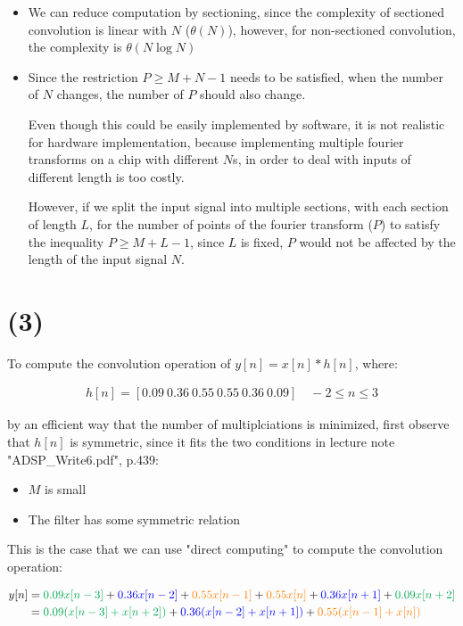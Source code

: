 \documentclass{article}
\begin{document}
\begin{itemize}
    \item We can reduce computation by sectioning, since the complexity of sectioned convolution is linear with $N$ ($\mathbb{\theta}(N)$),
    however, for non-sectioned convolution, the complexity is $\mathbb{\theta}(N \log N)$
    \item Since the restriction $P \geq M + N - 1$ needs to be satisfied, 
    when the number of $N$ changes, the number of $P$ should also change.
    \bigskip

    Even though this could be easily implemented by software, 
    it is not realistic for hardware implementation,
    because implementing multiple fourier transforms on a chip with different $N$s, 
    in order to deal with inputs of different length is too costly.
    \bigskip

    However, if we split the input signal into multiple sections,
    with each section of length $L$, 
    for the number of points of the fourier transform ($P$) to satisfy the inequality $P \geq M + L - 1$, 
    since $L$ is fixed, $P$ would not be affected by the length of the input signal $N$.
\end{itemize}

\section*{(3)}

To compute the convolution operation of $y[n] =  x[n] * h[n]$, where:

\begin{align*}
    h[n] = [0.09 \ 0.36 \ 0.55 \ 0.55 \ 0.36 \ 0.09] \quad -2 \leq n \leq 3 
\end{align*}

by an efficient way that the number of multiplciations is minimized, 
first observe that $h[n]$ is symmetric, 
since it fits the two conditions in lecture note "ADSP\_Write6.pdf", p.439: 

\begin{itemize}
    \item $M$ is small
    \item The filter has some symmetric relation
\end{itemize}

This is the case that we can use "direct computing" to compute the convolution operation:

\begin{align*}
    y[n] 
    &= 
    \textcolor{Green}{0.09 x[n - 3]} + 
    \textcolor{blue}{0.36 x[n - 2]} + 
    \textcolor{orange}{0.55 x[n - 1]} + 
    \textcolor{orange}{0.55 x[n]} + 
    \textcolor{blue}{0.36 x[n + 1]} + 
    \textcolor{Green}{0.09 x[n + 2]} \\
    &= 
    \textcolor{Green}{0.09 (x[n - 3] + x[n + 2])} + 
    \textcolor{blue}{0.36 (x[n - 2] + x[n + 1])} + 
    \textcolor{orange}{0.55 (x[n - 1] + x[n])} \\
\end{align*}
\end{document}
